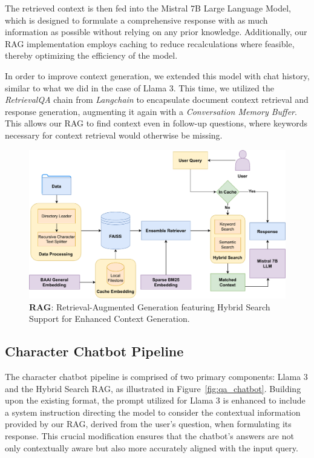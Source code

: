 \documentclass[fleqn,moreauthors,10pt]{ds_report}
\begin{document}
    The retrieved context is then fed into the Mistral 7B Large Language Model, which is designed to formulate a comprehensive response with as much information as possible without relying on any prior knowledge. Additionally, our RAG implementation employs caching to reduce recalculations where feasible, thereby optimizing the efficiency of the model.

    In order to improve context generation, we extended this model with chat history, similar to what we did in the case of Llama 3. This time, we utilized the \textit{RetrievalQA} chain from \textit{Langchain} to encapsulate document context retrieval and response generation, augmenting it again with a \textit{Conversation Memory Buffer}. This allows our RAG to find context even in follow-up questions, where keywords necessary for context retrieval would otherwise be missing.
    
    \begin{figure}[!htb]
            \centering 
    	\includegraphics[width=\linewidth]{fig/rag.drawio.pdf}
    	\caption{\textbf{RAG}: Retrieval-Augmented Generation featuring Hybrid Search Support for Enhanced Context Generation.}
    	\label{fig:rag}
    \end{figure}

    \subsection*{Character Chatbot Pipeline}

    The character chatbot pipeline is comprised of two primary components: Llama 3 and the Hybrid Search RAG, as illustrated in Figure~\ref{fig:qa_chatbot}. Building upon the existing format, the prompt utilized for Llama 3 is enhanced to include a system instruction directing the model to consider the contextual information provided by our RAG, derived from the user's question, when formulating its response. This crucial modification ensures that the chatbot's answers are not only contextually aware but also more accurately aligned with the input query.
\end{document}
